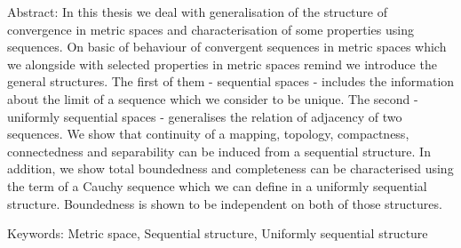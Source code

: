 \documentclass[12pt,a4paper]{report}
\let\openright=\clearpage
\def\chapwithtoc#1{
\chapter*{#1}
\addcontentsline{toc}{chapter}{#1}
}
\begin{document}
{Abstract:
In this thesis we deal with generalisation of the structure of convergence in metric spaces and characterisation of some properties using sequences. On basic of behaviour of convergent sequences in metric spaces which we alongside with selected properties in metric spaces remind we introduce the general structures. The first of them - sequential spaces - includes the information about the limit of a sequence which we consider to be unique. The second - uniformly sequential spaces - generalises the relation of adjacency of two sequences. We show that continuity of a mapping, topology, compactness, connectedness and separability can be induced from a sequential structure. In addition, we show total boundedness and completeness can be characterised using the term of a Cauchy sequence which we can define in a uniformly sequential structure. Boundedness is shown to be independent on both of those structures.

Keywords:
Metric space, Sequential structure, Uniformly sequential structure

\vss}

\newpage


\openright
\pagestyle{plain}
\setcounter{page}{1}
\tableofcontents






%

%

%






\openright
\end{document}
